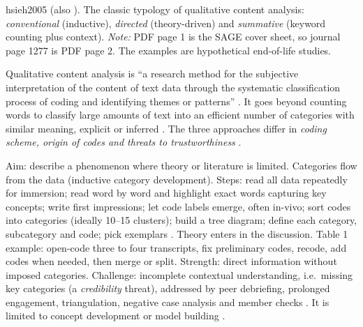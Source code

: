 \begin{papercard}{hsieh2005}
  (also ). The classic typology of qualitative content analysis: \emph{conventional} (inductive), \emph{directed} (theory-driven) and \emph{summative} (keyword counting plus context). \emph{Note:} PDF page 1 is the SAGE cover sheet, so journal page 1277 is PDF page 2. The examples are hypothetical end-of-life studies.

 Qualitative content analysis is ``a research method for the subjective interpretation of the content of text data through the systematic classification process of coding and identifying themes or patterns'' . It goes beyond counting words to classify large amounts of text into an efficient number of categories with similar meaning, explicit or inferred . The three approaches differ in \emph{coding scheme, origin of codes and threats to trustworthiness} .

 Aim: describe a phenomenon where theory or literature is limited. Categories flow from the data (inductive category development). Steps: read all data repeatedly for immersion; read word by word and highlight exact words capturing key concepts; write first impressions; let code labels emerge, often in-vivo; sort codes into categories (ideally 10--15 clusters); build a tree diagram; define each category, subcategory and code; pick exemplars . Theory enters in the discussion. Table 1 example: open-code three to four transcripts, fix preliminary codes, recode, add codes when needed, then merge or split. Strength: direct information without imposed categories. Challenge: incomplete contextual understanding, i.e.\ missing key categories (a \emph{credibility} threat), addressed by peer debriefing, prolonged engagement, triangulation, negative case analysis and member checks . It is limited to concept development or model building .


\end{papercard}
